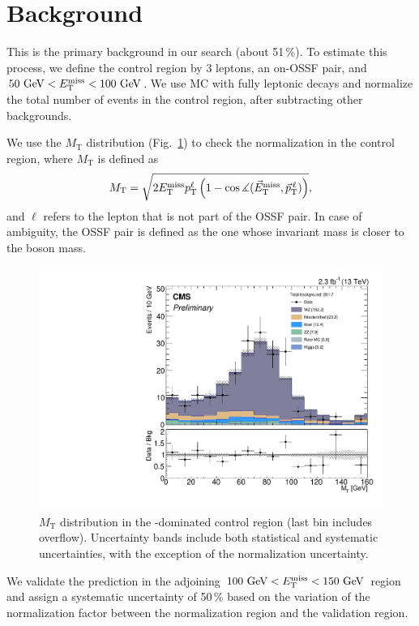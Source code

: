 \section{\texorpdfstring{\WZ}{WZ} Background}
\label{sec:bkg_WZ}

This is the primary background in our search (about 51\,\%). To estimate this process, we define the \WZ control region by 3 leptons, an on-\Z OSSF pair, and $50\,\,\text{Ge\hspace{-.08em}V} < E_{\mathrm{T}}^{\text{miss}} < 100\,\,\text{Ge\hspace{-.08em}V}$. We use \WZ MC with fully leptonic decays and normalize the total number of events in the control region, after subtracting other backgrounds.

We use the $M_\textrm{T}$ distribution (Fig.~\ref{fig:WZ}) to check the \WZ normalization in the control region, where $M_\textrm{T}$ is defined as
$$M_\textrm{T} = \sqrt{2 E_{\mathrm{T}}^{\text{miss}} p_\textrm{T}^\ell \left( 1 - \cos\measuredangle(\vec E_\textrm{T}^\text{miss}, \vec p_\textrm{T}^{\,\ell}) \right)},$$ and $\ell$ refers to the lepton that is not part of the OSSF pair. In case of ambiguity, the OSSF pair is defined as the one whose invariant mass is closer to the \Z boson mass.

\begin{figure}
\begin{center}
	\includegraphics[width=.7\textwidth]{Background/bkg_WZ/WZ_MET50to100_MT}
	\caption{$M_\textrm{T}$ distribution in the \WZ-dominated control region (last bin includes overflow). Uncertainty bands include both statistical and systematic uncertainties, with the exception of the \WZ normalization uncertainty.
	\label{fig:WZ}}
\end{center}
\end{figure}

We validate the prediction in the adjoining $100\,\,\text{Ge\hspace{-.08em}V} < E_{\mathrm{T}}^{\text{miss}} < 150\,\,\text{Ge\hspace{-.08em}V}$ region and assign a systematic uncertainty of 50\,\% based on the variation of the normalization factor between the normalization region and the validation region.
